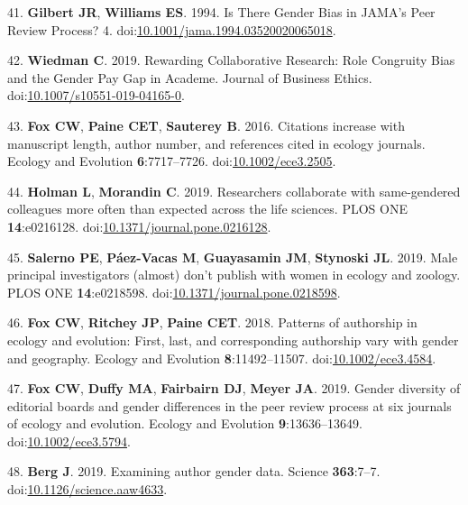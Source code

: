 \documentclass[11pt,]{article}
\begin{document}
\leavevmode\hypertarget{ref-gilbert_is_1994}{}%
41. \textbf{Gilbert JR}, \textbf{Williams ES}. 1994. Is There Gender
Bias in JAMA's Peer Review Process? 4.
doi:\href{https://doi.org/10.1001/jama.1994.03520020065018}{10.1001/jama.1994.03520020065018}.

\leavevmode\hypertarget{ref-wiedman_rewarding_2019}{}%
42. \textbf{Wiedman C}. 2019. Rewarding Collaborative Research: Role
Congruity Bias and the Gender Pay Gap in Academe. Journal of Business
Ethics.
doi:\href{https://doi.org/10.1007/s10551-019-04165-0}{10.1007/s10551-019-04165-0}.

\leavevmode\hypertarget{ref-fox_citations_2016}{}%
43. \textbf{Fox CW}, \textbf{Paine CET}, \textbf{Sauterey B}. 2016.
Citations increase with manuscript length, author number, and references
cited in ecology journals. Ecology and Evolution \textbf{6}:7717--7726.
doi:\href{https://doi.org/10.1002/ece3.2505}{10.1002/ece3.2505}.

\leavevmode\hypertarget{ref-holman_researchers_2019}{}%
44. \textbf{Holman L}, \textbf{Morandin C}. 2019. Researchers
collaborate with same-gendered colleagues more often than expected
across the life sciences. PLOS ONE \textbf{14}:e0216128.
doi:\href{https://doi.org/10.1371/journal.pone.0216128}{10.1371/journal.pone.0216128}.

\leavevmode\hypertarget{ref-Salerno2019}{}%
45. \textbf{Salerno PE}, \textbf{Páez-Vacas M}, \textbf{Guayasamin JM},
\textbf{Stynoski JL}. 2019. Male principal investigators (almost) don't
publish with women in ecology and zoology. PLOS ONE
\textbf{14}:e0218598.
doi:\href{https://doi.org/10.1371/journal.pone.0218598}{10.1371/journal.pone.0218598}.

\leavevmode\hypertarget{ref-Fox2018}{}%
46. \textbf{Fox CW}, \textbf{Ritchey JP}, \textbf{Paine CET}. 2018.
Patterns of authorship in ecology and evolution: First, last, and
corresponding authorship vary with gender and geography. Ecology and
Evolution \textbf{8}:11492--11507.
doi:\href{https://doi.org/10.1002/ece3.4584}{10.1002/ece3.4584}.

\leavevmode\hypertarget{ref-Fox2019}{}%
47. \textbf{Fox CW}, \textbf{Duffy MA}, \textbf{Fairbairn DJ},
\textbf{Meyer JA}. 2019. Gender diversity of editorial boards and gender
differences in the peer review process at six journals of ecology and
evolution. Ecology and Evolution \textbf{9}:13636--13649.
doi:\href{https://doi.org/10.1002/ece3.5794}{10.1002/ece3.5794}.

\leavevmode\hypertarget{ref-berg_examining_2019}{}%
48. \textbf{Berg J}. 2019. Examining author gender data. Science
\textbf{363}:7--7.
doi:\href{https://doi.org/10.1126/science.aaw4633}{10.1126/science.aaw4633}.
\end{document}

